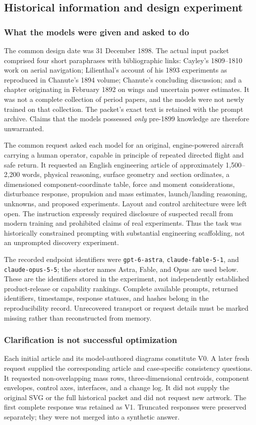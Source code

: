 \documentclass[11pt,a4paper]{article}
\begin{document}
\subsection{Historical information and design experiment}
\subsubsection{What the models were given and asked to do}
The common design date was 31 December 1898. The actual input packet comprised four short paraphrases with bibliographic links: Cayley's 1809--1810 work on aerial navigation; Lilienthal's account of his 1893 experiments as reproduced in Chanute's 1894 volume; Chanute's concluding discussion; and a chapter originating in February 1892 on wings and uncertain power estimates. It was not a complete collection of period papers, and the models were not newly trained on that collection. The packet's exact text is retained with the prompt archive. Claims that the models possessed \emph{only} pre-1899 knowledge are therefore unwarranted.

The common request asked each model for an original, engine-powered aircraft carrying a human operator, capable in principle of repeated directed flight and safe return. It requested an English engineering article of approximately 1,500--2,200 words, physical reasoning, surface geometry and section ordinates, a dimensioned component-coordinate table, force and moment considerations, disturbance response, propulsion and mass estimates, launch/landing reasoning, unknowns, and proposed experiments. Layout and control architecture were left open. The instruction expressly required disclosure of suspected recall from modern training and prohibited claims of real experiments. Thus the task was historically constrained prompting with substantial engineering scaffolding, not an unprompted discovery experiment.

The recorded endpoint identifiers were \texttt{gpt-6-astra}, \texttt{claude-fable-5-1}, and \texttt{claude-opus-5-5}; the shorter names Astra, Fable, and Opus are used below. These are the identifiers stored in the experiment, not independently established product-release or capability rankings. Complete available prompts, returned identifiers, timestamps, response statuses, and hashes belong in the reproducibility record. Unrecovered transport or request details must be marked missing rather than reconstructed from memory.

\subsubsection{Clarification is not successful optimization}
Each initial article and its model-authored diagrams constitute V0. A later fresh request supplied the corresponding article and case-specific consistency questions. It requested non-overlapping mass rows, three-dimensional centroids, component envelopes, control axes, interfaces, and a change log. It did not supply the original SVG or the full historical packet and did not request new artwork. The first complete response was retained as V1. Truncated responses were preserved separately; they were not merged into a synthetic answer.
\end{document}
